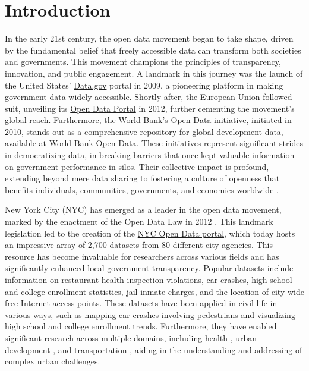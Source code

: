 \documentclass[12pt, titlepage]{article}
\begin{document}
\section{Introduction} 
\label{sec:intro}
In the early 21st century,
the open data movement began to take shape, driven by the
fundamental belief that freely accessible data can transform 
both societies and governments. This movement champions the principles
of transparency, innovation, and public engagement. 
A landmark in this journey was the launch of the United States'
\href{https://www.data.gov}{Data.gov} portal in 2009, a pioneering
platform in making government data widely accessible. Shortly after,
the European Union followed suit, unveiling its
\href{https://data.europa.eu/euodp}{Open Data Portal} in 2012, further
cementing the movement's global reach. Furthermore, the World Bank's Open
Data initiative, initiated in 2010, stands out as a comprehensive
repository for global development data, available at
\href{https://data.worldbank.org}{World Bank Open Data}. 
These initiatives represent significant strides in democratizing data, 
in breaking barriers that once kept valuable information 
on government performance in silos. Their collective impact 
is profound, extending beyond mere data sharing to 
fostering a culture of openness that benefits individuals, 
communities, governments, and economies worldwide 
\citep{barns2016mine, wang2016adoption}.


New York City (NYC) has emerged as a leader in the open data movement,
marked by the enactment of the Open Data Law in 2012
\citep{zuiderwijk2014open}. This landmark legislation led to the
creation of the \href{https://opendata.cityofnewyork.us}{NYC Open Data
  portal}, which today hosts an impressive array of 2,700 datasets
from 80 different city agencies. This resource has become invaluable
for researchers across various fields and has significantly enhanced
local government transparency. Popular datasets include information on
restaurant health inspection violations, car crashes, high school and
college enrollment statistics, jail inmate charges, and the location
of city-wide free Internet access points. These datasets have been
applied in civil life in various ways, such as mapping car crashes
involving pedestrians and visualizing high school and college
enrollment trends. Furthermore, they have enabled significant research
across multiple domains, including health \citep{cantor2018facets,
  shankar2021data}, urban development \citep{neves2020impacts}, and
transportation \citep{gerte2019understanding}, aiding in the
understanding and addressing of complex urban challenges.
\end{document}
